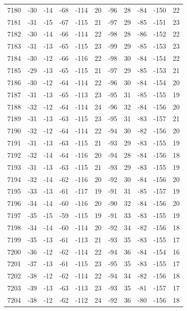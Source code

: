 \begin{table}[H]
\begin{tabular}{lllllllllll}
7180 & -30 & -14 & -68 & -114 & 20 & -96 & 28 & -84 & -150 & 22 \\
7181 & -31 & -15 & -67 & -115 & 21 & -97 & 29 & -85 & -151 & 23 \\
7182 & -30 & -14 & -66 & -114 & 22 & -98 & 28 & -86 & -152 & 22 \\
7183 & -31 & -13 & -65 & -115 & 23 & -99 & 29 & -85 & -153 & 23 \\
7184 & -30 & -12 & -66 & -116 & 22 & -98 & 30 & -84 & -154 & 22 \\
7185 & -29 & -13 & -65 & -115 & 21 & -97 & 29 & -85 & -153 & 21 \\
7186 & -30 & -12 & -64 & -114 & 22 & -96 & 30 & -84 & -154 & 20 \\
7187 & -31 & -13 & -65 & -113 & 23 & -95 & 31 & -85 & -155 & 19 \\
7188 & -32 & -12 & -64 & -114 & 24 & -96 & 32 & -84 & -156 & 20 \\
7189 & -31 & -13 & -63 & -115 & 23 & -95 & 31 & -83 & -157 & 21 \\
7190 & -32 & -12 & -64 & -114 & 22 & -94 & 30 & -82 & -156 & 20 \\
7191 & -31 & -13 & -63 & -115 & 21 & -93 & 29 & -83 & -155 & 19 \\
7192 & -32 & -14 & -64 & -116 & 20 & -94 & 28 & -84 & -156 & 18 \\
7193 & -31 & -13 & -63 & -115 & 21 & -93 & 29 & -83 & -155 & 19 \\
7194 & -32 & -14 & -62 & -116 & 20 & -92 & 30 & -84 & -156 & 20 \\
7195 & -33 & -13 & -61 & -117 & 19 & -91 & 31 & -85 & -157 & 19 \\
7196 & -34 & -14 & -60 & -116 & 20 & -90 & 32 & -84 & -156 & 20 \\
7197 & -35 & -15 & -59 & -115 & 19 & -91 & 33 & -83 & -155 & 19 \\
7198 & -34 & -14 & -60 & -114 & 20 & -92 & 34 & -82 & -156 & 18 \\
7199 & -35 & -13 & -61 & -113 & 21 & -93 & 35 & -83 & -155 & 17 \\
7200 & -36 & -12 & -62 & -114 & 22 & -94 & 36 & -84 & -154 & 16 \\
7201 & -37 & -13 & -61 & -115 & 23 & -95 & 35 & -83 & -155 & 17 \\
7202 & -38 & -12 & -62 & -114 & 22 & -94 & 34 & -82 & -156 & 18 \\
7203 & -39 & -13 & -63 & -113 & 23 & -93 & 35 & -81 & -157 & 17 \\
7204 & -38 & -12 & -62 & -112 & 24 & -92 & 36 & -80 & -156 & 18 \\

\end{tabular}
\end{table}

